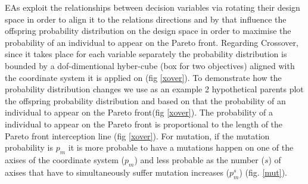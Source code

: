 EAs exploit the relationships between decision variables via rotating their design space in order to align it to the relations directions and by that influence the offspring probability distribution on the design space in order to maximise the probability of an individual to appear on the Pareto front. Regarding Crossover, since it takes place for each variable separately the probability distribution is bounded by a dof-dimentional hyber-cube (box for two objectives) aligned with the coordinate system it is applied on (fig \ref{xover}). To demonstrate how the probability distribution changes we use as an example 2 hypothetical parents plot the offspring probability distribution and based on that the probability of an individual to appear on the Pareto front(fig \ref{xover}). The probability of a individual to appear on the Pareto front is proportional to the length of the Pareto front interception line (fig \ref{xover}). For mutation, if the mutation probability is $p_m$ it is more probable to have a mutations happen on one of the axises of the coordinate system ($p_m$) and less probable as the number ($s$) of axises that have to simultaneously suffer mutation increases ($p_m^s$) (fig. \ref{mut}).      



